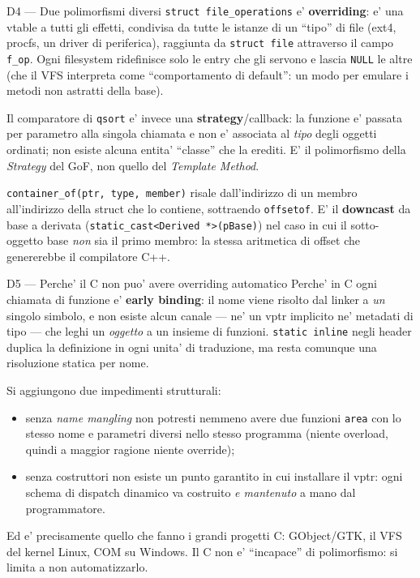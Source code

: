\documentclass{report}
\newcommand{\code}[1]{\texttt{\small #1}}
\begin{document}
\begin{soluzione}{D4 --- Due polimorfismi diversi}
\label{sol:D4}
\code{struct file\_operations} e' \textbf{overriding}: e' una vtable a tutti gli
effetti, condivisa da tutte le istanze di un ``tipo'' di file (ext4, procfs, un
driver di periferica), raggiunta da \code{struct file} attraverso il campo
\code{f\_op}. Ogni filesystem ridefinisce solo le entry che gli servono e lascia
\code{NULL} le altre (che il VFS interpreta come ``comportamento di default'':
un modo per emulare i metodi non astratti della base).

Il comparatore di \code{qsort} e' invece una \textbf{strategy}/callback: la
funzione e' passata per parametro alla singola chiamata e non e' associata al
\emph{tipo} degli oggetti ordinati; non esiste alcuna entita' ``classe'' che la
erediti. E' il polimorfismo della \emph{Strategy} del GoF, non quello del
\emph{Template Method}.

\code{container\_of(ptr, type, member)} risale dall'indirizzo di un membro
all'indirizzo della struct che lo contiene, sottraendo \code{offsetof}. E' il
\textbf{downcast} da base a derivata (\code{static\_cast<Derived *>(pBase)}) nel
caso in cui il sotto-oggetto base \emph{non} sia il primo membro: la stessa
aritmetica di offset che genererebbe il compilatore C++.
\end{soluzione}

\begin{soluzione}{D5 --- Perche' il C non puo' avere overriding automatico}
\label{sol:D5}
Perche' in C ogni chiamata di funzione e' \textbf{early binding}: il nome viene
risolto dal linker a \emph{un} singolo simbolo, e non esiste alcun canale --- ne'
un vptr implicito ne' metadati di tipo --- che leghi un \emph{oggetto} a un
insieme di funzioni. \code{static inline} negli header duplica la definizione in
ogni unita' di traduzione, ma resta comunque una risoluzione statica per nome.

Si aggiungono due impedimenti strutturali:
\begin{itemize}
    \item senza \emph{name mangling} non potresti nemmeno avere due funzioni
          \code{area} con lo stesso nome e parametri diversi nello stesso
          programma (niente overload, quindi a maggior ragione niente override);
    \item senza costruttori non esiste un punto garantito in cui installare il
          vptr: ogni schema di dispatch dinamico va costruito \emph{e mantenuto}
          a mano dal programmatore.
\end{itemize}
Ed e' precisamente quello che fanno i grandi progetti C: GObject/GTK, il VFS del
kernel Linux, COM su Windows. Il C non e' ``incapace'' di polimorfismo: si
limita a non automatizzarlo.
\end{soluzione}
\end{document}
